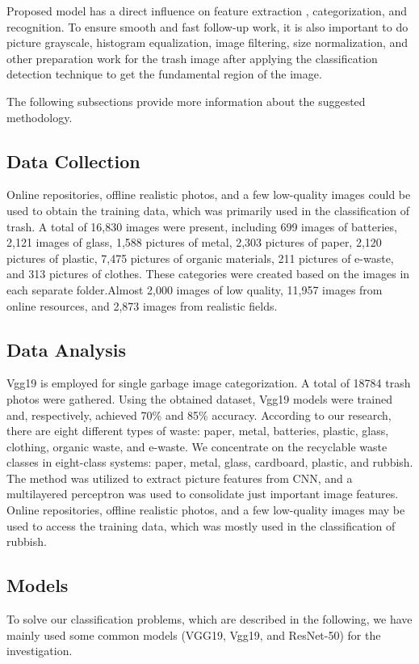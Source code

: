 \documentclass[conference]{IEEEtran}
\begin{document}
Proposed model has a direct influence on feature extraction \cite{b3}, categorization, and recognition. To ensure smooth and fast follow-up work, it is also important to do picture grayscale, histogram equalization, image filtering, size normalization, and other preparation work for the trash image after applying the classification detection technique to get the fundamental region of the image.

The following subsections provide more information about the suggested methodology.

\subsection{Data Collection}
Online repositories, offline realistic photos, and a few low-quality images could be used to obtain the training data, which was primarily used in the classification of trash. A total of 16,830 images were present, including 699 images of batteries, 2,121 images of glass, 1,588 pictures of metal, 2,303 pictures of paper, 2,120 pictures of plastic, 7,475 pictures of organic materials, 211 pictures of e-waste, and 313 pictures of clothes. These categories were created based on the images in each separate folder.Almost 2,000 images of low quality, 11,957 images from online resources, and 2,873 images from realistic fields.
\subsection{Data Analysis}
Vgg19 is employed for single garbage image categorization. A total of 18784 trash photos were gathered. Using the obtained dataset, Vgg19 models were trained and, respectively, achieved 70\% and 85\% accuracy. According to our research, there are eight different types of waste: paper, metal, batteries, plastic, glass, clothing, organic waste, and e-waste. We concentrate on the recyclable waste classes in eight-class systems: paper, metal, glass, cardboard, plastic, and rubbish. The method was utilized to extract picture features from CNN, and a multilayered perceptron was used to consolidate just important image features. Online repositories, offline realistic photos, and a few low-quality images may be used to access the training data, which was mostly used in the classification of rubbish.
\subsection{Models}
To solve our classification problems, which are described in the following, we have mainly used some common models (VGG19, Vgg19, and ResNet-50) for the investigation.
\end{document}
